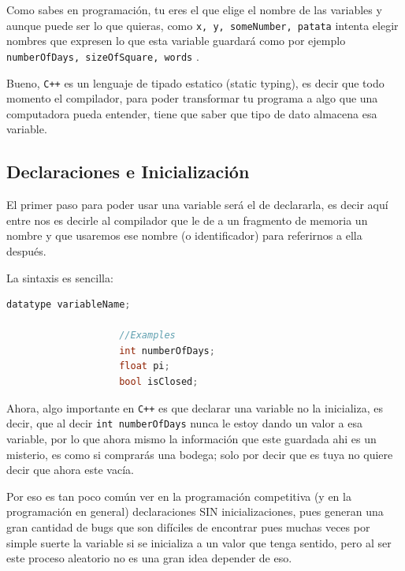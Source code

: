 \documentclass[12pt, fleqn]{report}                             %
\theoremstyle{break}                                            %
\newcommand{\textCode}[1]  { \texttt{#1} }                      %
\newcommand{\Cpp}{\ignorespaces\textCode{C++}}                  %
\begin{document}
            Como sabes en programación, tu eres el que elige el nombre de las variables y aunque puede
            ser lo que quieras, como \textCode{x, y, someNumber, patata} intenta elegir nombres que expresen
            lo que esta variable guardará como por ejemplo \textCode{numberOfDays, sizeOfSquare, words}. 

            Bueno, \Cpp es un lenguaje de tipado estatico (static typing), es decir que todo momento el compilador,
            para poder transformar tu programa a algo que una computadora pueda entender, tiene
            que saber que tipo de dato almacena esa variable.

            \subsection{Declaraciones e Inicialización}

                El primer paso para poder usar una variable será el de declararla, es decir
                aquí entre nos es decirle al compilador que le de a un fragmento de memoria 
                un nombre y que usaremos ese nombre (o identificador) para referirnos a ella después.

                La sintaxis es sencilla:
                \begin{lstlisting}[language=C++, gobble=20]
                    datatype variableName;

                    //Examples
                    int numberOfDays;
                    float pi;
                    bool isClosed;
                \end{lstlisting}

                Ahora, algo importante en \Cpp es que declarar una variable no la inicializa, 
                es decir, que al decir \textCode{int numberOfDays} nunca le estoy dando un valor a
                esa variable, por lo que ahora mismo la información que este guardada ahi es un misterio,
                es como si comprarás una bodega; solo por decir que es tuya no quiere decir que ahora este
                vacía.

                Por eso es tan poco común ver en la programación competitiva (y en la programación en general)
                declaraciones SIN inicializaciones,
                pues generan una gran cantidad de bugs que son difíciles de encontrar pues muchas veces
                por simple suerte la variable si se inicializa a un valor que tenga sentido, pero
                al ser este proceso aleatorio no es una gran idea depender de eso.
\end{document}
